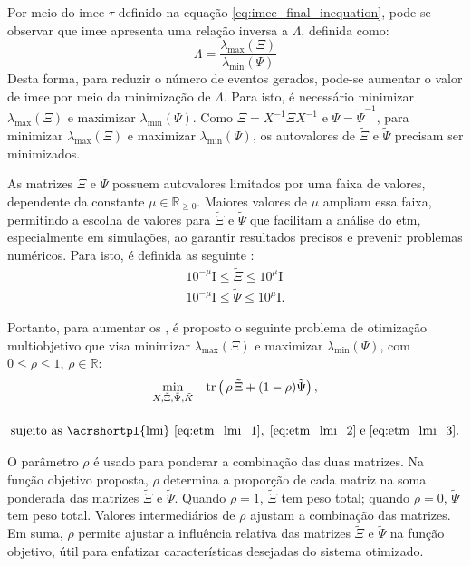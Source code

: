 Por meio do \acrshort{imee} $\tau$ definido na equação \eqref{eq:imee_final_inequation}, pode-se observar que \acrshort{imee} apresenta uma relação inversa a $\Lambda$, definida como: \begin{equation}
  \Lambda = \frac{\lambda_{\max}(\Xi)}{\lambda_{\min}(\Psi)}
\end{equation} Desta forma, para reduzir o número de eventos gerados, pode-se aumentar o valor de \acrshort{imee} por meio da minimização de $\Lambda$. Para isto, é necessário minimizar $\lambda_{\max} (\Xi)$ e maximizar $\lambda_{\min}(\Psi)$. Como $\Xi = X^{-1}\tilde{\Xi}X^{-1}$ e $\Psi = \tilde{\Psi}^{-1}$, para minimizar $\lambda_{\max} (\Xi)$ e maximizar $\lambda_{\min}(\Psi)$, os autovalores de $\tilde{\Xi}$ e $\tilde{\Psi}$ precisam ser minimizados.

As matrizes $\tilde{\Xi}$ e $\tilde{\Psi}$ possuem autovalores limitados por uma faixa de valores, dependente da constante $\mu \in \mathbb{R}_{\geq 0}$. Maiores valores de $\mu$ ampliam essa faixa, permitindo a escolha de valores para $\tilde{\Xi}$ e $\tilde{\Psi}$ que facilitam a análise do \acrshort{etm}, especialmente em simulações, ao garantir resultados precisos e prevenir problemas numéricos. Para isto, é definida as seguinte : \begin{gather}
  10^{-\mu} \mathrm{I} \leq \tilde{\Xi} \leq 10^{\mu} \mathrm{I} \label{eq:etm_lmi_2}\\
  10^{-\mu} \mathrm{I} \leq \tilde{\Psi} \leq 10^{\mu} \mathrm{I} \label{eq:etm_lmi_3}.
\end{gather}

Portanto, para aumentar os , é proposto o seguinte problema de otimização multiobjetivo que visa minimizar $\lambda_{\max} (\Xi)$ e maximizar $\lambda_{\min}(\Psi)$, com $0 \leq \rho \leq 1, \, \rho \in \mathbb{R}$: \begin{gather}\underset{X, \tilde{\Xi}, \tilde{\Psi}, \tilde{K}}\min \quad \mathrm{tr}\left(\,\rho \, \tilde{\Xi} + (1 - \rho)\tilde{\Psi}\right), \label{eq:optimization_problem} \\[12pt] \textrm{sujeito as \acrshortpl{lmi} } \eqref{eq:etm_lmi_1}, \hspace{0.1cm} \eqref{eq:etm_lmi_2} \hspace{0.1cm} \mathrm{e} \hspace{0.1cm} \eqref{eq:etm_lmi_3}. \notag \end{gather} 

O parâmetro $\rho$ é usado para ponderar a combinação das duas matrizes. Na função objetivo proposta, $\rho$ determina a proporção de cada matriz na soma ponderada das matrizes $\tilde{\Xi}$ e $\tilde{\Psi}$. Quando $\rho = 1$, $\tilde{\Xi}$ tem peso total; quando $\rho = 0$, $\tilde{\Psi}$ tem peso total. Valores intermediários de $\rho$ ajustam a combinação das matrizes. Em suma, $\rho$ permite ajustar a influência relativa das matrizes $\tilde{\Xi}$ e $\tilde{\Psi}$ na função objetivo, útil para enfatizar características desejadas do sistema otimizado.

